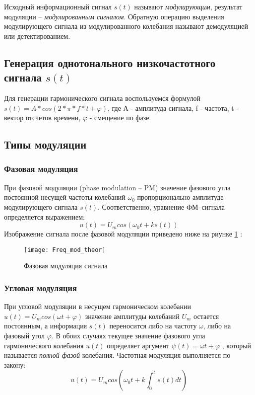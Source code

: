 Исходный информационный сигнал $s(t)$ называют \textit{модулирующим}, результат модуляции    –    \textit{модулированным сигналом}. Обратную операцию выделения модулирующего сигнала из модулированного колебания называют демодуляцией или детектированием.

\subsection{Генерация однотонального низкочастотного сигнала $s(t)$}
Для генерации гармонического сигнала воспользуемся формулой $s(t) = A*cos(2*\pi * f*t + \varphi)$, где А - амплитуда сигнала, f - частота, t - вектор отсчетов времени, $\varphi$ - смещение по фазе.

\subsection{Типы модуляции}
\subsubsection{Фазовая модуляция}
При фазовой модуляции (phase modulation – PM) значение фазового угла постоянной несущей частоты колебаний $\omega_0$ пропорционально амплитуде модулирующего сигнала $s(t)$. Соответственно, уравнение ФМ–сигнала определяется выражением: 
\begin{equation}
	u(t) = U_m cos(\omega_0 t + k s(t))
\end{equation}
Изображение сигнала после фазовой модуляции приведено ниже на риунке \ref{pic:Freq_mod_theor} :
\begin{figure}[H]
	\begin{center}
		\texttt{[image: Freq\_mod\_theor]}
		\caption{Фазовая модуляция сигнала} 
		\label{pic:Freq_mod_theor} %
	\end{center}
\end{figure}

\subsubsection{Угловая модуляция}
При угловой модуляции в несущем гармоническом колебании $u(t) = U_m cos(\omega t + \varphi)$  значение амплитуды колебаний $U_m$ остается постоянным, а информация $s(t)$ переносится либо на частоту $\omega$, либо на фазовый угол $\varphi$. В обоих случаях текущее значение фазового угла гармонического колебания $u(t)$ определяет аргумент $\psi (t) = \omega t + \varphi$ , который называется \textit{полной фазой} колебания.
Частотная модуляция выполняется по закону: 
\begin{equation}
	u(t) = U_m cos(\omega_0 t + k \int_{0}^{t} s(t) dt)
\end{equation}

